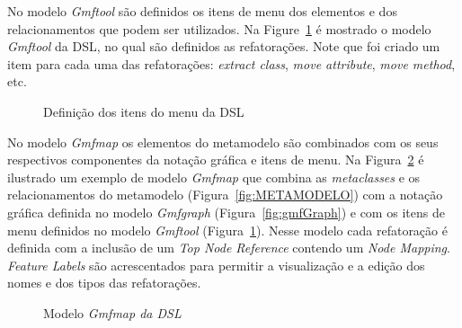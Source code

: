 No modelo \textit{Gmftool} são definidos os itens de menu dos elementos e dos relacionamentos que podem ser utilizados. Na Figure~\ref{fig:gmfTool} é mostrado o modelo \textit{Gmftool} da DSL, no qual são definidos as refatorações. Note que foi criado um item para cada uma das refatorações: \textit{extract class}, \textit{move attribute}, \textit{move method}, etc.

\begin{figure}[h!]
 \centering

\caption{Definição dos itens do menu da DSL}
 \label{fig:gmfTool}
\end{figure}
\FloatBarrier


No modelo \textit{Gmfmap} os elementos do metamodelo são combinados com os seus respectivos componentes da notação gráfica e itens de menu. Na Figura~\ref{fig:gmfMap} é ilustrado um exemplo de modelo \textit{Gmfmap} que combina as \textit{metaclasses} e os relacionamentos do metamodelo (Figura~\ref{fig:METAMODELO}) com a notação gráfica definida no modelo \textit{Gmfgraph} (Figura~\ref{fig:gmfGraph}) e com os itens de menu definidos no modelo \textit{Gmftool} (Figura~\ref{fig:gmfTool}). Nesse modelo cada refatoração é definida com a inclusão de um \textit{Top Node Reference} contendo um \textit{Node Mapping}. \textit{Feature Labels} são acrescentados para permitir a visualização e a edição dos nomes e dos tipos das refatorações.


\begin{figure}[h!]
 \centering

\caption{Modelo \textit{Gmfmap da DSL}}
 \label{fig:gmfMap}
\end{figure}
\FloatBarrier

